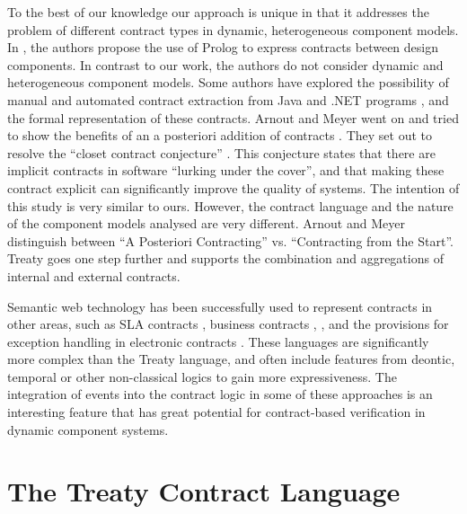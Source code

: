 \documentclass{llncs}
\begin{document}
To the best of our knowledge our approach is unique in that it addresses the problem of different contract types in dynamic, heterogeneous component models. In \cite{Dong2003}, the authors propose the use of Prolog to express contracts between design components. In contrast to our work, the authors do not consider dynamic and heterogeneous component models. Some authors have explored the possibility of manual and automated contract extraction from Java \cite{Henkel03,MilanovicMalek2004} and .NET programs \cite{ArnoutMeyer2003a}, and the formal representation of these contracts. Arnout and Meyer went on and tried to show the benefits of an a posteriori addition of contracts \cite{ArnoutMeyer2003b}. They set out to resolve the ``closet contract
conjecture'' \cite{ArnoutMeyer2003b}. This conjecture states that there are implicit contracts in software ``lurking under the cover'', and that making
these contract explicit can significantly improve the quality of systems. The intention of this study is very similar to ours. However, the contract language and the nature of the component models analysed are very different. Arnout and Meyer distinguish between ``A Posteriori Contracting'' vs. ``Contracting from the Start''. Treaty goes one step further and supports the combination and aggregations of internal and external contracts. 

Semantic web technology has been successfully used to represent contracts in other areas, such as SLA contracts \cite{PaschkeDietrich2005}, business
contracts \cite{Linington04}, \cite{Governatori06} ,\cite{Governatori05} and the provisions for exception handling in electronic contracts \cite{SweetDeal}. These languages are significantly more complex than the Treaty language, and often include features from deontic, temporal or other non-classical logics to gain more expressiveness. The integration of events into the contract logic in some of these approaches is an interesting feature that has great potential for contract-based verification in dynamic component systems. 


\section{The Treaty Contract Language}
\end{document}
